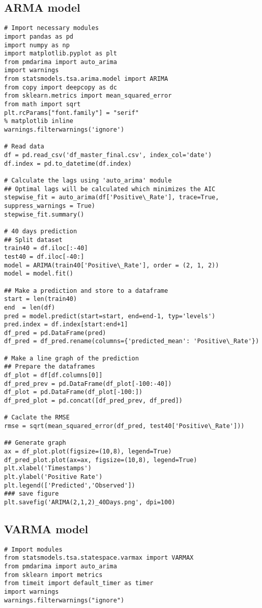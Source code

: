 \begin{appendices}
\subsection{ARMA model}
\begin{verbatim}
# Import necessary modules
import pandas as pd
import numpy as np
import matplotlib.pyplot as plt
from pmdarima import auto_arima
import warnings
from statsmodels.tsa.arima.model import ARIMA
from copy import deepcopy as dc
from sklearn.metrics import mean_squared_error
from math import sqrt
plt.rcParams["font.family"] = "serif"
% matplotlib inline
warnings.filterwarnings('ignore')

# Read data
df = pd.read_csv('df_master_final.csv', index_col='date')
df.index = pd.to_datetime(df.index)

# Calculate the lags using 'auto_arima' module
## Optimal lags will be calculated which minimizes the AIC
stepwise_fit = auto_arima(df['Positive\_Rate'], trace=True, suppress_warnings = True)
stepwise_fit.summary()

# 40 days prediction
## Split dataset
train40 = df.iloc[:-40]
test40 = df.iloc[-40:]
model = ARIMA(train40['Positive\_Rate'], order = (2, 1, 2))
model = model.fit()

## Make a prediction and store to a dataframe
start = len(train40)
end  = len(df)
pred = model.predict(start=start, end=end-1, typ='levels')
pred.index = df.index[start:end+1]
df_pred = pd.DataFrame(pred)
df_pred = df_pred.rename(columns={'predicted_mean': 'Positive\_Rate'})

# Make a line graph of the prediction
## Prepare the dataframes
df_plot = df[df.columns[0]]
df_pred_prev = pd.DataFrame(df_plot[-100:-40])
df_plot = pd.DataFrame(df_plot[-100:])
df_pred_plot = pd.concat([df_pred_prev, df_pred])

# Caclate the RMSE
rmse = sqrt(mean_squared_error(df_pred, test40['Positive\_Rate']))

## Generate graph
ax = df_plot.plot(figsize=(10,8), legend=True)
df_pred_plot.plot(ax=ax, figsize=(10,8), legend=True)
plt.xlabel('Timestamps')
plt.ylabel('Positive Rate')
plt.legend(['Predicted','Observed'])
### save figure
plt.savefig('ARIMA(2,1,2)_40Days.png', dpi=100)
\end{verbatim}


\subsection{VARMA model}
\begin{verbatim}
# Import modules
from statsmodels.tsa.statespace.varmax import VARMAX
from pmdarima import auto_arima
from sklearn import metrics
from timeit import default_timer as timer
import warnings
warnings.filterwarnings("ignore")


\end{verbatim}
\end{appendices}
